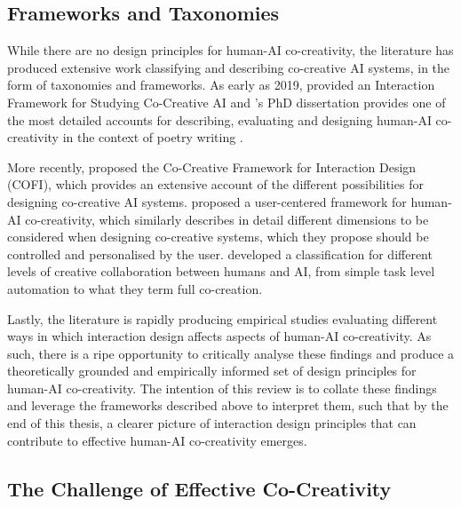 \subsection{Frameworks and Taxonomies}

While there are no design principles for human-AI co-creativity, the literature has produced extensive work classifying and describing co-creative AI systems, in the form of taxonomies and frameworks. As early as 2019, \citet{Guzdial2019-gr} provided an Interaction Framework for Studying Co-Creative AI and \citeauthor{Kantosalo2019-pz}'s PhD dissertation provides one of the most detailed accounts for describing, evaluating and designing human-AI co-creativity in the context of poetry writing \citep{Kantosalo2019-pz}. 

More recently, \citet{Rezwana2022-gg} proposed the Co-Creative Framework for Interaction Design (COFI), which provides an extensive account of the different possibilities for designing co-creative AI systems. \citet{Moruzzi2024-cq} proposed a user-centered framework for human-AI co-creativity, which similarly describes in detail different dimensions to be considered when designing co-creative systems, which they propose should be controlled and personalised by the user. \citet{Haase2024-yp} developed a classification for different levels of creative collaboration between humans and AI, from simple task level automation to what they term full co-creation. 

Lastly, the literature is rapidly producing empirical studies evaluating different ways in which interaction design affects aspects of human-AI co-creativity. As such, there is a ripe opportunity to critically analyse these findings and produce a theoretically grounded and empirically informed set of design principles for human-AI co-creativity. The intention of this review is to collate these findings and leverage the frameworks described above to interpret them, such that by the end of this thesis, a clearer picture of interaction design principles that can contribute to effective human-AI co-creativity emerges. 

\subsection{The Challenge of Effective Co-Creativity}

